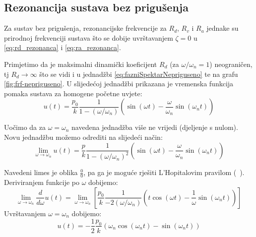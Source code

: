 \subsection{Rezonancija sustava bez prigušenja}
Za sustav bez prigušenja, rezonancijske frekvencije za $R_d$, $R_v$ i $R_a$ jednake su
prirodnoj frekvenciji sustava što se dobije uvrštavanjem $\zeta = 0$ u \eqref{eq:rd_rezonanca} i 
\eqref{eq:ra_rezonanca}. 
\par

Primjetimo da je maksimalni dinamički koeficijent $R_d$ (za $\omega/\omega_n = 1$) 
neograničen, tj $R_d\to \infty$ što se vidi i u jednadžbi \eqref{eq:fazniSpektarNepriguseno} 
te na grafu \ref{fig:frf-nepriguseno}. U slijedećoj jednadžbi prikazana je vremenska 
funkcija pomaka sustava za homogene početne uvjete:
\begin{equation}
    u(t)=\frac{p_0}{k}\frac{1}{1-(\omega/\omega_n)}
            \left(\sin(\omega t) - \frac{\omega}{\omega_n}\sin(\omega_n t)\right)
\end{equation}

Uočimo da za $\omega = \omega_n$ navedena jednadžba više ne vrijedi (djeljenje s
nulom). Novu jednadžbu možemo odrediti na slijedeći način:
\begin{equation}\label{eq:limes}
    \lim_{\omega\to\omega_n}{u(t)} = 
        \frac{p}{k}\frac{1}{1-(\omega/\omega_n)^2}
            \left(\sin(\omega t) - \frac{\omega}{\omega_n}\sin(\omega_n t)\right)
\end{equation}

Navedeni limes je oblika $\frac{0}{0}$, pa ga je moguće rješiti L'Hopitalovim
pravilom (~\cite{dk_skripta}). Deriviranjem funkcije po $\omega$ dobijemo:
\begin{equation}\label{eq:lhopitalovo_limes}
    \lim_{\omega\to\omega_n}\frac{d}{d\omega}u(t)=
    \lim_{\omega\to\omega_n} \left[
        \frac{p_0}{k}\frac{1}{-2(\omega/\omega_n)}
            \left(t\cos(\omega t) - \frac{1}{\omega}\sin(\omega_n t)\right)
           \right]
\end{equation}
Uvrštavanjem $\omega=\omega_n$ dobijemo:
\begin{equation}\label{eq:odziv_rezonanca}
    u(t)=-\frac{1}{2}\frac{p_0}{k}(\omega_n\cos(\omega_n t)-\sin(\omega_nt))
\end{equation}

